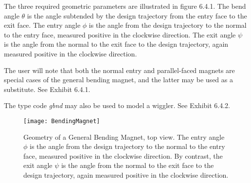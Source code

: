          The three required geometric parameters are illustrated in figure
6.4.1.  The bend angle $\theta$ is the angle subtended by the design trajectory
from the entry face to the exit face.  The entry angle $\phi$ is the angle from
the design trajectory to the normal to the entry face, measured positive in
the clockwise direction.  The exit angle $\psi$ is the angle from the
normal to the exit face to the design trajectory, again measured positive in the
clockwise direction.

         The user will note that both the normal entry and parallel-faced
magnets are special cases of the general bending magnet, and the latter may
be used as a substitute.  See Exhibit 6.4.1.

The type code {\em gbnd} may also be used to model a wiggler.  See
Exhibit 6.4.2.

\begin{figure}
  \centering
  \texttt{[image: BendingMagnet]}
  \caption{Geometry of a General Bending Magnet, top view.  The entry angle $\phi$ is the angle from the design trajectory to the normal to the entry face, measured positive in the clockwise direction.  By contrast, the exit angle $\psi$ is the angle from the normal to the exit face to the design trajectory, again measured positive in the clockwise direction.}
\end{figure}
\clearpage

